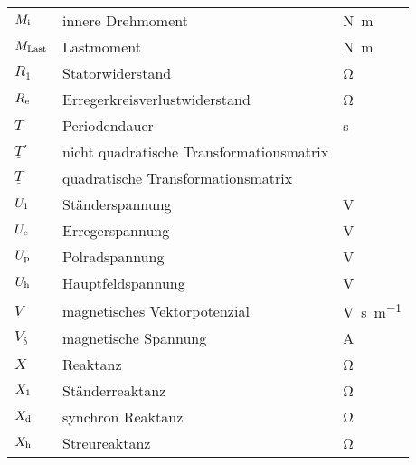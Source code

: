 \begin{flushleft}
\begin{tabularx}{\textwidth}{lll}
$M_{\mathrm{i}}$			&	innere Drehmoment		&	\si{\newton\meter} \\
$M_{\mathrm{Last}}$			&	Lastmoment		&	\si{\newton\meter} \\
$R_\mathrm{1}$		&	Statorwiderstand			&	\si{\ohm} \\
$R_{\mathrm{e}}$	&	Erregerkreisverlustwiderstand &	\si{\ohm}\\
$T$ & Periodendauer & \si{\second} \\
$\underline{T}'$ & nicht quadratische Transformationsmatrix & \\
$\underline{T}$ & quadratische Transformationsmatrix & \\
$U_{\mathrm{1}}$ & Ständerspannung & \si{\volt}\\
$U_{\mathrm{e}}$ & Erregerspannung & \si{\volt}\\
$U_{\mathrm{p}}$ & Polradspannung & \si{\volt}\\
$U_{\mathrm{h}}$ & Hauptfeldspannung & \si{\volt}\\
$V$ &	magnetisches Vektorpotenzial&	\si{\volt\second\per\meter}\\
$V_\mathrm{\delta}$		&	magnetische Spannung		&	\si{\ampere} \\
$X$	& 	Reaktanz & \si{\ohm}\\
$X_{\mathrm{1}}$	& 	Ständerreaktanz & \si{\ohm}\\
$X_{\mathrm{d}}$	& 	synchron Reaktanz & \si{\ohm}\\
$X_{\mathrm{h}}$	& 	Streureaktanz & \si{\ohm}\\
\bottomrule
\end{tabularx}
\end{flushleft}

